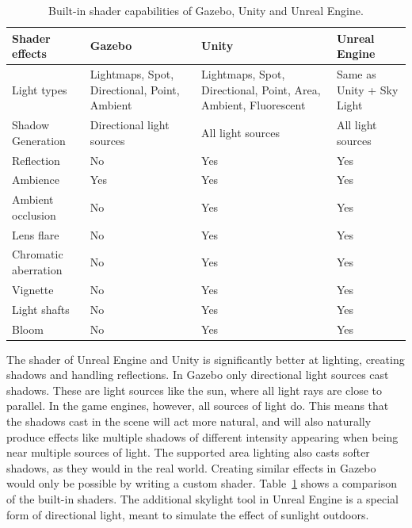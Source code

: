 \begin{table}[!htb]
    \centering
    \caption{Built-in shader capabilities of Gazebo, Unity and Unreal Engine.}
    \label{tab:comparison_shader}
    \begin{tabular}{|>{\centering\arraybackslash}m{3cm}|>{\centering\arraybackslash}m{3.5cm}|>{\centering\arraybackslash}m{4cm}|>{\centering\arraybackslash}m{3.5cm}|} \hline
        \textbf{Shader effects} & \textbf{Gazebo} & \textbf{Unity} & \textbf{Unreal Engine} \\ \hline\hline
        Light types     & Lightmaps, Spot, Directional, Point, Ambient & Lightmaps, Spot, Directional, Point, Area, Ambient, Fluorescent & Same as Unity + Sky Light \\ \hline
        Shadow Generation & Directional light sources & All light sources & All light sources \\ \hline
        Reflection      & No & Yes & Yes \\ \hline
        Ambience        & Yes & Yes & Yes \\ \hline
        Ambient occlusion & No & Yes & Yes \\ \hline
        Lens flare & No & Yes & Yes \\ \hline
        Chromatic aberration & No & Yes & Yes \\ \hline
        Vignette        & No & Yes & Yes \\ \hline
        Light shafts    & No & Yes & Yes \\ \hline
        Bloom & No & Yes & Yes \\ \hline
    \end{tabular}
\end{table}

The shader of Unreal Engine and Unity is significantly better at lighting, creating shadows and handling reflections. In Gazebo only directional light sources cast shadows. These are light sources like the sun, where all light rays are close to parallel. In the game engines, however, all sources of light do. This means that the shadows cast in the scene will act more natural, and will also naturally produce effects like multiple shadows of different intensity appearing when being near multiple sources of light. The supported area lighting also casts softer shadows, as they would in the real world. Creating similar effects in Gazebo would only be possible by writing a custom shader. Table~\ref{tab:comparison_shader} shows a comparison of the built-in shaders. The additional skylight tool in Unreal Engine is a special form of directional light, meant to simulate the effect of sunlight outdoors. 

